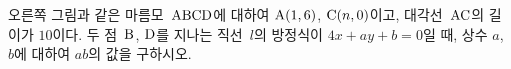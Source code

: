 \noindent\begin{minipage}[t]{0.58\linewidth}\vspace{0pt}\raggedright 오른쪽 그림과 같은 마름모~$\mathrm{ABCD}$에 대하여 $\mathrm{A}(1{,}\mkern3mu\mathopen{}6)$, $\mathrm{C}(n{,}\mkern3mu\mathopen{}0)$이고, 대각선~$\mathrm{AC}$의 길이가 $10$이다. 두 점~$\mathrm{B}$, $\mathrm{D}$를 지나는 직선~$l$의 방정식이 $4x+ay+b=0$일 때, 상수 $a$, $b$에 대하여 $ab$의 값을 구하시오. \end{minipage}\hfill\begin{minipage}[t]{0.4\linewidth}\vspace{0pt}\centering \resizebox{\ifdim\width>\linewidth\linewidth\else\width\fi}{!}{}\end{minipage}\par

